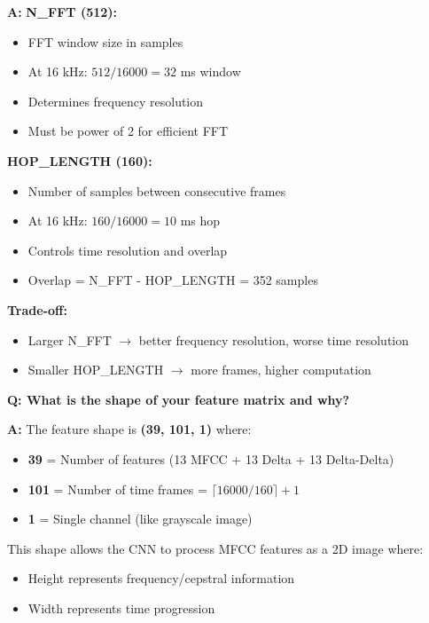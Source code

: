 \documentclass[a4paper,12pt]{article}
\newcommand{\vivaQ}[1]{\textcolor{questioncolor}{\textbf{Q: #1}}}
\newcommand{\vivaA}[1]{\textcolor{answercolor}{\textbf{A:}} #1}
\begin{document}
\vivaA{\textbf{N\_FFT (512):}
\begin{itemize}
    \item FFT window size in samples
    \item At 16 kHz: $512/16000 = 32$ ms window
    \item Determines frequency resolution
    \item Must be power of 2 for efficient FFT
\end{itemize}

\textbf{HOP\_LENGTH (160):}
\begin{itemize}
    \item Number of samples between consecutive frames
    \item At 16 kHz: $160/16000 = 10$ ms hop
    \item Controls time resolution and overlap
    \item Overlap = N\_FFT - HOP\_LENGTH = 352 samples
\end{itemize}

\textbf{Trade-off:}
\begin{itemize}
    \item Larger N\_FFT $\rightarrow$ better frequency resolution, worse time resolution
    \item Smaller HOP\_LENGTH $\rightarrow$ more frames, higher computation
\end{itemize}}

\vspace{0.5cm}

\vivaQ{What is the shape of your feature matrix and why?}

\vivaA{The feature shape is \textbf{(39, 101, 1)} where:
\begin{itemize}
    \item \textbf{39} = Number of features (13 MFCC + 13 Delta + 13 Delta-Delta)
    \item \textbf{101} = Number of time frames = $\lceil 16000/160 \rceil + 1$
    \item \textbf{1} = Single channel (like grayscale image)
\end{itemize}

This shape allows the CNN to process MFCC features as a 2D image where:
\begin{itemize}
    \item Height represents frequency/cepstral information
    \item Width represents time progression
\end{itemize}}
\end{document}
